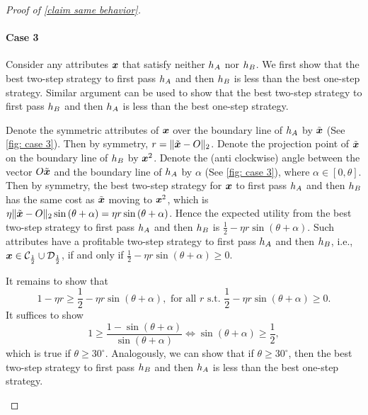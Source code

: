 \begin{proof}[Proof of \cref{claim same behavior}]
    \paragraph{Case 3} Consider any attributes $\features$ that satisfy neither $\classifier_A$  nor $\classifier_B$.
    We first show that the best two-step strategy to first pass $\classifier_A$ and then $\classifier_B$ is less than the best one-step strategy.
    Similar argument can be used to show that the best two-step strategy to first pass $\classifier_B$ and then $\classifier_A$ is less than the best one-step strategy.
    
    Denote the symmetric attributes of $\features$ over the boundary line of $\classifier_A$ by $\tilde\features$ (See \cref{fig: case 3}).
    Then by symmetry, $r=\|\tilde\features - O\|_2$.
    Denote the projection point of $\tilde\features$ on the boundary line of $\classifier_B$ by $\secondfeatures$.
    Denote the (anti clockwise) angle between the vector $O\tilde\features$ and the boundary line of $\classifier_A$ by $\alpha$ (See \cref{fig: case 3}), where $\alpha\in [0,\theta]$.
    Then by symmetry, the best two-step strategy for $\features$ to first pass $\classifier_A$ and then $\classifier_B$ has the same cost as $\tilde\features$ moving to $\secondfeatures$, which is $\eta \|\tilde\features - O\|_2 \sin{(\theta+\alpha)}=\eta r \sin{(\theta+\alpha)}$.
 Hence the expected utility from the best two-step strategy to first pass $\classifier_A$ and then $\classifier_B$ is $\frac12-\eta r \sin{(\theta+\alpha)}$.
    Such attributes have a profitable two-step strategy to first pass $\classifier_A$ and then $\classifier_B$, i.e., $\features\in \setonetwo_{\frac12}\cup\settwoone_{\frac12}$, if and only if $\frac12-\eta r \sin{(\theta+\alpha)}\geq 0$.
    
    It remains to show that 
    $$1-\eta r\geq \frac12-\eta r \sin{(\theta+\alpha)}, \text{ for all } r \text{ s.t. } \frac12-\eta r \sin{(\theta+\alpha)}\geq 0.$$
    It suffices to show 
    $$1\geq \frac{1- \sin{(\theta+\alpha)}}{\sin{(\theta+\alpha)}}\Leftrightarrow \sin{(\theta+\alpha)}\geq \frac12,$$ 
    which is true if $\theta\geq 30^{\circ}$.
    Analogously, we can show that  if $\theta\geq 30^{\circ}$, then the best two-step strategy to first pass $\classifier_B$ and then $\classifier_A$ is less than the best one-step strategy.
    
    \begin{figure}[t]
\centering
\begin{tikzpicture}[xscale=8,yscale=8]


\end{tikzpicture}
\end{figure}
\end{proof}
